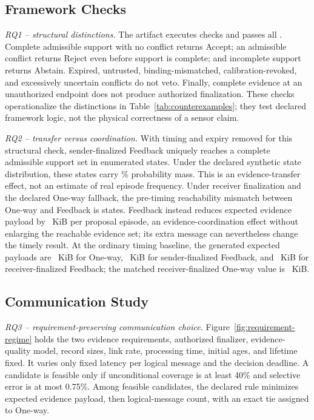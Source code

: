 \subsection{Framework Checks}

\emph{RQ1 -- structural distinctions.} The artifact executes
\FrameworkStructuralCheckCount{} checks and passes all
\FrameworkStructuralPassCount{}. Complete admissible support with no conflict
returns Accept; an admissible conflict returns Reject even before support is
complete; and incomplete support returns Abstain. Expired, untrusted,
binding-mismatched, calibration-revoked, and excessively uncertain conflicts
do not veto. Finally, complete evidence at an unauthorized endpoint does not
produce authorized finalization. These checks operationalize the distinctions
in Table~\ref{tab:counterexamples}; they test declared framework logic, not the
physical correctness of a sensor claim.

\emph{RQ2 -- transfer versus coordination.} With timing and expiry removed for
this structural check, sender-finalized Feedback uniquely reaches a complete
admissible support set in \SenderTransferGainStateCount{} enumerated states.
Under the declared synthetic state distribution, these states carry
\SenderTransferGainMassPercent{}\% probability mass. This is an
evidence-transfer effect, not an estimate of real episode frequency. Under
receiver finalization and the declared One-way fallback, the pre-timing
reachability mismatch between One-way and Feedback is
\ReceiverReachabilityMismatchCount{} states. Feedback instead reduces expected
evidence payload by \ReceiverCoordinationSavingKiB{}~KiB per proposal episode,
an evidence-coordination effect without enlarging the reachable evidence set;
its extra message can nevertheless change the timely result. At the ordinary
timing baseline, the generated expected payloads are
\ConceptSenderOnePayload{}~KiB for One-way,
\ConceptSenderFeedbackPayload{}~KiB for sender-finalized Feedback, and
\ConceptReceiverFeedbackPayload{}~KiB for receiver-finalized Feedback; the
matched receiver-finalized One-way value is \ConceptReceiverOnePayload{}~KiB.

\subsection{Communication Study}

\emph{RQ3 -- requirement-preserving communication choice.} Figure~\ref{fig:requirement-regime}
holds the two evidence requirements, authorized finalizer, evidence-quality
model, record sizes, link rate, processing time, initial ages, and lifetime
fixed. It varies only fixed latency per logical message and the decision
deadline. A candidate is feasible only if unconditional coverage is at least
40\% and selective error is at most 0.75\%. Among feasible candidates, the
declared rule minimizes expected evidence payload, then logical-message count,
with an exact tie assigned to One-way.

